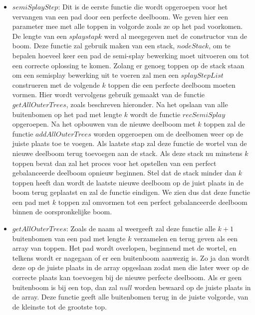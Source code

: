 \documentclass[dutch, 11pt]{report}
\begin{document}
\begin{itemize}
	\item $semiSplayStep$: Dit is de eerste functie die wordt opgeroepen voor het vervangen van een pad door een perfecte deelboom. We geven hier een parameter mee met alle toppen in volgorde zoals ze op het pad voorkomen. De lengte van een $splaystap k$ werd al meegegeven met de constructor van de boom. Deze functie zal gebruik maken van een stack, $nodeStack$,  om te bepalen hoeveel keer een pad de semi-splay bewerking moet uitvoeren om tot een correcte oplossing te komen. Zolang er genoeg toppen op de stack staan om een semisplay bewerking uit te voeren zal men een $splayStepList$ construeren met de volgende $k$ toppen die een perfecte deelboom moeten vormen. Hier wordt vervolgens gebruik gemaakt van de functie $getAllOuterTrees$, zoals beschreven hieronder. Na het opslaan van alle buitenbomen op het pad met lengte $k$ wordt de functie $recSemiSplay$ opgeroepen. Na het opbouwen van de nieuwe deelboom met $k$ toppen zal de functie $addAllOuterTrees$ worden opgeroepen om de deelbomen weer op de juiste plaats toe te voegen. Als laatste stap zal deze functie de wortel van de nieuwe deelboom terug toevoegen aan de stack. Als deze stack nu minstens $k$ toppen bevat dan zal het proces voor het opstellen van een perfect gebalanceerde deelboom opnieuw beginnen. Stel dat de stack minder dan $k$ toppen heeft dan wordt de laatste nieuwe deelboom op de juist plaats in de boom terug geplaatst en zal de functie eindigen. We zien dus dat deze functie een pad met $k$ toppen zal omvormen tot een perfect gebalanceerde deelboom binnen de oorspronkelijke boom.
	\item $getAllOuterTrees$: Zoals de naam al weergeeft zal deze functie alle $k+1$ buitenbomen van een pad met lengte $k$ verzamelen en terug geven als een array van toppen. Het pad wordt overlopen, beginnend met de wortel, en telkens wordt er nagegaan of er een buitenboom aanwezig is. Zo ja dan wordt deze op de juiste plaats in de array opgeslaan zodat men die later weer op de correcte plaats kan toevoegen bij de nieuwe perfecte deelboom. Als er geen buitenboom is bij een top, dan zal $null$ worden bewaard op de juiste plaats in de array. Deze functie geeft alle buitenbomen terug in de juiste volgorde, van de kleinste tot de grootste top.

\end{itemize}
\end{document}

